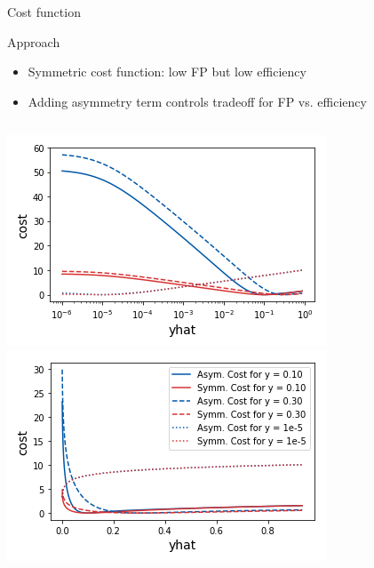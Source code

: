 \begin{frame}{Cost function}
    \begin{block}{Approach}
      \begin{itemize}
         \item Symmetric cost function: low FP but low efficiency
         \item Adding asymmetry term controls tradeoff for FP vs. efficiency
     \end{itemize}
    \end{block}

  \begin{columns}[c]
    \centering
    \includegraphics[width=\textwidth, trim=20 0 20 0]{images/Asym_CostPlot_190302.png}
    \centering
    \includegraphics[width=\textwidth, trim=20 0 20 0]{images/Asym_CostPlot_190302_linear.png}
    \centering

\end{columns}
\end{frame}

